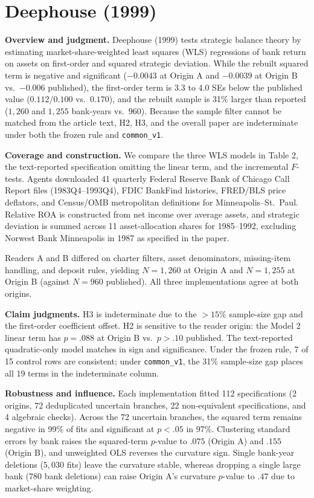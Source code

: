 \documentclass[11pt]{article}
\begin{document}
\section{Deephouse (1999)}\label{sec:deephouse}
\textbf{Overview and judgment.} Deephouse (1999) tests strategic balance theory by estimating market-share-weighted least squares (WLS) regressions of bank return on assets on first-order and squared strategic deviation. While the rebuilt squared term is negative and significant ($-0.0043$ at Origin A and $-0.0039$ at Origin B vs.\ $-0.006$ published), the first-order term is 3.3 to 4.0 SEs below the published value ($0.112/0.100$ vs.\ $0.170$), and the rebuilt sample is 31\% larger than reported ($1,260$ and $1,255$ bank-years vs.\ $960$). Because the sample filter cannot be matched from the article text, H2, H3, and the overall paper are indeterminate under both the frozen rule and \texttt{common\_v1}.

\textbf{Coverage and construction.} We compare the three WLS models in Table 2, the text-reported specification omitting the linear term, and the incremental $F$-tests. Agents downloaded 41 quarterly Federal Reserve Bank of Chicago Call Report files (1983Q4--1993Q4), FDIC BankFind histories, FRED/BLS price deflators, and Census/OMB metropolitan definitions for Minneapolis--St.\ Paul. Relative ROA is constructed from net income over average assets, and strategic deviation is summed across 11 asset-allocation shares for 1985--1992, excluding Norwest Bank Minneapolis in 1987 as specified in the paper.

Readers A and B differed on charter filters, asset denominators, missing-item handling, and deposit rules, yielding $N = 1,260$ at Origin A and $N = 1,255$ at Origin B (against $N = 960$ published). All three implementations agree at both origins.


\textbf{Claim judgments.} H3 is indeterminate due to the $>15\%$ sample-size gap and the first-order coefficient offset. H2 is sensitive to the reader origin: the Model 2 linear term has $p=.088$ at Origin B vs.\ $p>.10$ published. The text-reported quadratic-only model matches in sign and significance. Under the frozen rule, 7 of 15 control rows are consistent; under \texttt{common\_v1}, the 31\% sample-size gap places all 19 terms in the indeterminate column.

\textbf{Robustness and influence.} Each implementation fitted 112 specifications (2 origins, 72 deduplicated uncertain branches, 22 non-equivalent specifications, and 4 algebraic checks). Across the 72 uncertain branches, the squared term remains negative in 99\% of fits and significant at $p<.05$ in 97\%. Clustering standard errors by bank raises the squared-term $p$-value to $.075$ (Origin A) and $.155$ (Origin B), and unweighted OLS reverses the curvature sign. Single bank-year deletions ($5,030$ fits) leave the curvature stable, whereas dropping a single large bank (780 bank deletions) can raise Origin A's curvature $p$-value to $.47$ due to market-share weighting.
\end{document}
